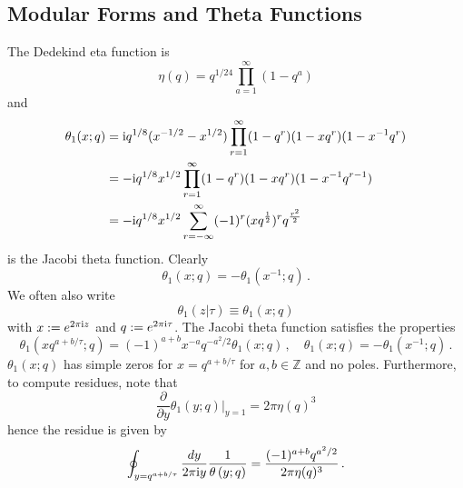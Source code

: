 \documentclass[main.tex]{subfiles}
\begin{document}
\subsection{Modular Forms and Theta Functions}
The Dedekind eta function is
\begin{equation}
\eta(q)=q^{1/24}\prod_{a=1}^{\infty}(1-q^a)
\end{equation}
and
\begin{equation}
\begin{aligned}\label{eqn:Jacobitheta}
\theta_1(x;q)&=\mathrm{i} q^{1/8}(x^{-1/2}-x^{1/2})\prod_{r=1}^{\infty}(1-q^r)(1-xq^r)(1-x^{-1}q^r)\\
&=-\mathrm{i} q^{1/8}x^{1/2}\prod_{r=1}^{\infty}(1-q^r)(1-xq^r)(1-x^{-1}q^{r-1})\\
&=-\mathrm{i} q^{1/8}x^{1/2}\sum_{r=-\infty}^{\infty}(-1)^r(xq^{\frac{1}{2}})^rq^{\frac{r^2}{2}}
\end{aligned}
\end{equation}
is the Jacobi theta function. Clearly
\begin{equation}
\theta_1\left(x;q\right)=-\theta_1\left(x^{-1};q\right)\,.
\end{equation} 
We often also write
\begin{equation}
\theta_1\left(z|\tau\right)\equiv\theta_1\left(x;q\right)
\end{equation} 
with $x:=e^{2\pi\mathrm{i} z}$ and $ q:=e^{2\pi\mathrm{i}\tau}$. The Jacobi theta function satisfies the properties
\begin{equation}
\theta_1\left(xq^{a+b/\tau};q\right)=(-1)^{a+b}x^{-a}q^{-a^2/2}\theta_1\left(x;q\right)\,,\quad \theta_1(x;q)=-\theta_1(x^{-1};q)\,.
\end{equation}
$\theta_1\left(x;q\right)$ has simple zeros for $x=q^{a+b/\tau}$ for $a,b\in\mathbb{Z}$ and no poles. Furthermore, to compute residues, note that
\begin{equation}
\frac{\partial}{\partial y}\theta_1\left(y;q\right)|_{y=1}=2\pi\eta(q)^3
\end{equation}
hence the residue is given by
\begin{equation}
\oint_{y=q^{a+b/\tau}}\frac{dy}{2\pi\mathrm{i} y}\frac{1}{\theta\left(y;q\right)}=\frac{(-1)^{a+b}q^{a^2/2}}{2\pi\eta(q)^3}\,.
\end{equation}
\end{document}
